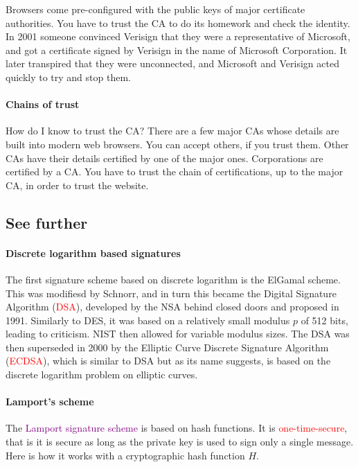 \documentclass[a4paper, 11pt, openany]{book}
\numberwithin{equation}{section}
\theoremstyle{plain}
\theoremstyle{definition}
\newcommand{\Important}[1]{\textcolor{red}{#1}}
\newcommand{\Define}[1]{\textcolor{purple}{#1}}
\begin{document}
Browsers come pre-configured with the public keys of major certificate authorities. You have to trust the CA to do its homework and check the identity. In 2001 someone convinced Verisign that they were a representative of Microsoft, and got a certificate signed by Verisign in the name of Microsoft Corporation. It later transpired that they were unconnected, and Microsoft and Verisign acted quickly to try and stop them.



\paragraph{Chains of trust}

How do I know to trust the CA? There are a few major CAs whose details are built into modern web browsers. You can accept others, if you trust them. Other CAs have their details certified by one of the major ones. Corporations are certified by a CA. You have to trust the chain of certifications, up to the major CA, in order to trust the website.



\subsection{See further}

\paragraph{Discrete logarithm based signatures}
The first signature scheme based on discrete logarithm is the ElGamal scheme. This was modifiesd by Schnorr, and in turn this became the Digital Signature Algorithm (\Important{DSA}), developed by the NSA behind closed doors and proposed in 1991. Similarly to DES, it was based on a relatively small modulus $p$ of 512 bits, leading to criticism. NIST then allowed for variable modulus sizes. The DSA was then superseded in 2000 by the Elliptic Curve Discrete Signature Algorithm (\Important{ECDSA}), which is similar to DSA but as its name suggests, is based on the discrete logarithm problem on elliptic curves.

\paragraph{Lamport's scheme}
The \Define{Lamport signature scheme} is based on hash functions. It is \Important{one-time-secure}, that is it is secure as long as the private key is used to sign only a single message. Here is how it works with a cryptographic hash function $H$. 
\end{document}
